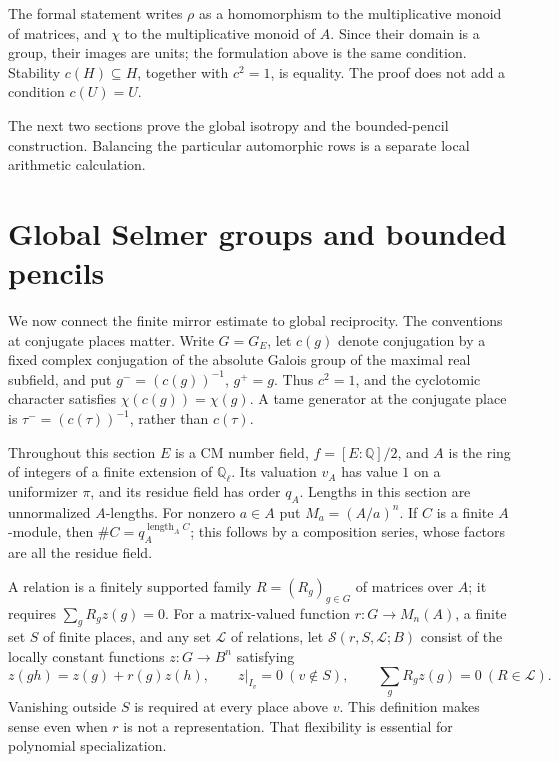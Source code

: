\documentclass[11pt,a4paper]{article}
\theoremstyle{definition}
\newcommand{\Q}{\mathbb Q}
\newcommand{\length}{\operatorname{length}}
\begin{document}
The formal statement writes \(\rho\) as a homomorphism to the multiplicative
monoid of matrices, and \(\chi\) to the multiplicative monoid of \(A\).
Since their domain is a group, their images are units; the formulation
above is the same condition. Stability \(c(H)\subseteq H\), together with
\(c^2=1\), is equality. The proof does not add a condition \(c(U)=U\).

The next two sections prove the global isotropy and the bounded-pencil
construction. Balancing the particular automorphic rows is a separate
local arithmetic calculation.



\section{Global Selmer groups and bounded pencils}\label{sec:global-selmer}
We now connect the finite mirror estimate to global reciprocity.
The conventions at conjugate places matter. Write \(G=G_E\), let
\(c(g)\) denote conjugation by a fixed complex conjugation of the
absolute Galois group of the maximal real subfield, and put
\(g^-=(c(g))^{-1}\), \(g^+=g\).
Thus \(c^2=1\), and the cyclotomic character satisfies
\(\chi(c(g))=\chi(g)\). A tame generator at the conjugate place is
\(\tau^-=(c(\tau))^{-1}\), rather than \(c(\tau)\).

Throughout this section \(E\) is a CM number field,
\(f=[E:\Q]/2\), and \(A\) is the ring of integers of a finite
extension of \(\Q_\ell\). Its valuation \(v_A\) has value \(1\) on
a uniformizer \(\pi\), and its residue field has order \(q_A\).
Lengths in this section are unnormalized \(A\)-lengths.
For nonzero \(a\in A\) put \(M_a=(A/a)^n\).
If \(C\) is a finite \(A\)-module, then
\(\#C=q_A^{\length_A C}\); this follows by a composition series,
whose factors are all the residue field.

A relation is a finitely supported family \(R=(R_g)_{g\in G}\)
of matrices over \(A\); it requires
\(\sum_gR_gz(g)=0\).
For a matrix-valued function \(r:G\to M_n(A)\), a finite set \(S\)
of finite places, and any set \(\mathcal L\) of relations, let
\(\mathcal S(r,S,\mathcal L;B)\) consist of the locally constant
functions \(z:G\to B^n\) satisfying
\[
 z(gh)=z(g)+r(g)z(h),\qquad
 z|_{I_v}=0\ (v\notin S),\qquad
 \sum_gR_gz(g)=0\ (R\in\mathcal L).
\]
Vanishing outside \(S\) is required at every place above \(v\).
This definition makes sense even when \(r\) is not a representation.
That flexibility is essential for polynomial specialization.
\end{document}
